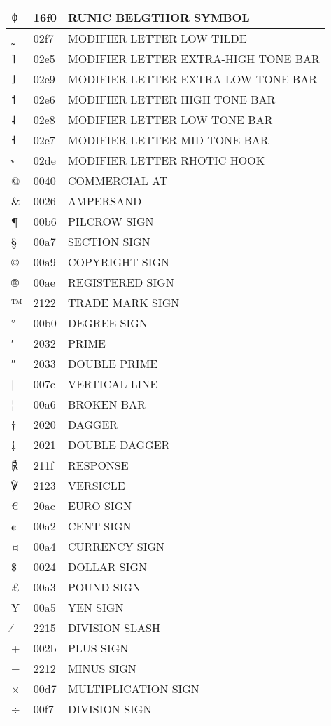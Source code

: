 \documentclass[12pt,letterpaper,openany]{book}
\begin{document}
\begin{center}
\begin{supertabular}{|m{0.25in}|m{0.5in}|m{4in}|}
ᛰ & 16f0 & RUNIC BELGTHOR SYMBOL\\\hline
˷ & 02f7 & MODIFIER LETTER LOW TILDE\\\hline
˥ & 02e5 & MODIFIER LETTER EXTRA-HIGH TONE BAR\\\hline
˩ & 02e9 & MODIFIER LETTER EXTRA-LOW TONE BAR\\\hline
˦ & 02e6 & MODIFIER LETTER HIGH TONE BAR\\\hline
˨ & 02e8 & MODIFIER LETTER LOW TONE BAR\\\hline
˧ & 02e7 & MODIFIER LETTER MID TONE BAR\\\hline
˞ & 02de & MODIFIER LETTER RHOTIC HOOK\\\hline
@ & 0040 & COMMERCIAL AT\\\hline
\& & 0026 & AMPERSAND\\\hline
¶ & 00b6 & PILCROW SIGN\\\hline
§ & 00a7 & SECTION SIGN\\\hline
© & 00a9 & COPYRIGHT SIGN\\\hline
® & 00ae & REGISTERED SIGN\\\hline
™ & 2122 & TRADE MARK SIGN\\\hline
° & 00b0 & DEGREE SIGN\\\hline
′ & 2032 & PRIME\\\hline
″ & 2033 & DOUBLE PRIME\\\hline
| & 007c & VERTICAL LINE\\\hline
¦ & 00a6 & BROKEN BAR\\\hline
† & 2020 & DAGGER\\\hline
‡ & 2021 & DOUBLE DAGGER\\\hline
℟ & 211f & RESPONSE\\\hline
℣ & 2123 & VERSICLE\\\hline
€ & 20ac & EURO SIGN\\\hline
¢ & 00a2 & CENT SIGN\\\hline
¤ & 00a4 & CURRENCY SIGN\\\hline
\$ & 0024 & DOLLAR SIGN\\\hline
£ & 00a3 & POUND SIGN\\\hline
¥ & 00a5 & YEN SIGN\\\hline
∕ & 2215 & DIVISION SLASH\\\hline
+ & 002b & PLUS SIGN\\\hline
− & 2212 & MINUS SIGN\\\hline
× & 00d7 & MULTIPLICATION SIGN\\\hline
÷ & 00f7 & DIVISION SIGN\\\hline

\end{supertabular}
\end{center}
\end{document}
